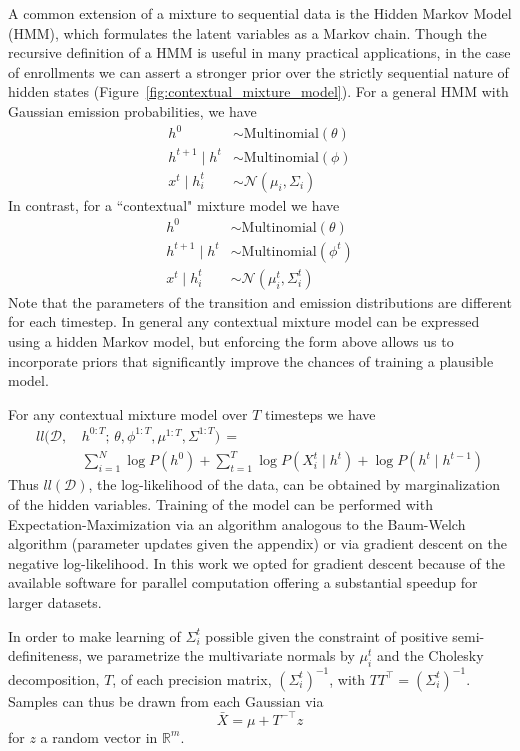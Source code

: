\documentclass{edm_template}
\begin{document}
A common extension of a mixture to sequential data is the Hidden Markov Model (HMM), which formulates the latent variables as a Markov chain. Though the recursive definition of a HMM is useful in many practical applications, in the case of enrollments we can assert a stronger prior over the strictly sequential nature of hidden states (Figure~\ref{fig:contextual_mixture_model}). For a general HMM with Gaussian emission probabilities, we have 
\begin{align*}
h^0 &\sim \text{Multinomial}(\theta) \\    
h^{t+1} \mid h^{t} &\sim \text{Multinomial}(\phi) \\
x^{t} \mid h_i^{t} &\sim \mathcal{N}(\mu_i, \Sigma_i)
\end{align*}
In contrast, for a ``contextual" mixture model we have 
\begin{align*}
h^0 &\sim \text{Multinomial}(\theta) \\    
h^{t+1} \mid h^{t} &\sim \text{Multinomial}(\phi^t) \\
x^{t} \mid h_i^{t} &\sim \mathcal{N}(\mu^t_i, \Sigma^t_i)
\end{align*}
Note that the parameters of the transition and emission distributions are different for each timestep. In general any contextual mixture model can be expressed using a hidden Markov model, but enforcing the form above allows us to incorporate priors that significantly improve the chances of training a plausible model.

For any contextual mixture model over $T$ timesteps we have
\begin{align*}
ll(\mathcal{D}, \, &h^{0:T} ; \, \theta,\phi^{1:T},\mu^{1:T},\Sigma^{1:T}) \, = \\
&\sum_{i=1}^N \log P(h^0) + \sum_{t=1}^T \log P(X^t_i \mid h^t) + \log P(h^t \mid h^{t-1})
\end{align*}
Thus $ll(\mathcal{D})$, the log-likelihood of the data, can be obtained by marginalization of the hidden variables. Training of the model can be performed with Expectation-Maximization via an algorithm analogous to the Baum-Welch algorithm (parameter updates given the appendix) or via gradient descent on the negative log-likelihood. In this work we opted for gradient descent because of the available software for parallel computation offering a substantial speedup for larger datasets. 

In order to make learning of $\Sigma^t_i$ possible given the constraint of positive semi-definiteness, we parametrize the multivariate normals by $\mu_i^t$ and the Cholesky decomposition, $T$, of each precision matrix, $(\Sigma^t_i)^{-1}$, with $TT^\top = (\Sigma^t_i)^{-1}$. Samples can thus be drawn from each Gaussian via 
$$\bar{X} = \mu + T^{-\top} z$$ 
for $z$ a random vector in $\mathbb{R}^m$. 
\end{document}
